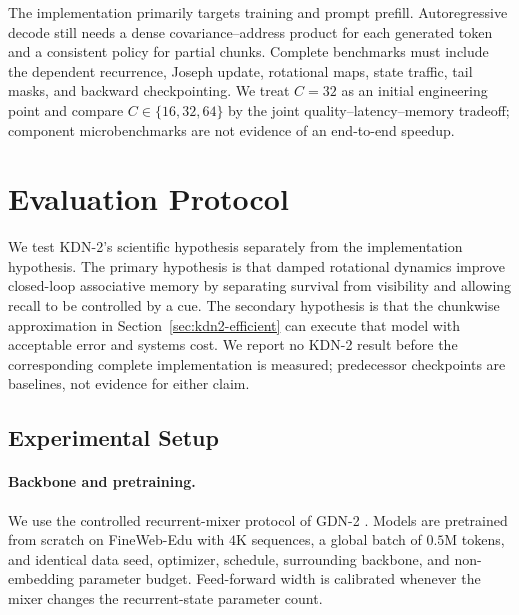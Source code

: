 \documentclass[11pt,letterpaper,logo]{yalearxiv}
\begin{document}
The implementation primarily targets training and prompt prefill. Autoregressive decode still
needs a dense covariance--address product for each generated token and a consistent policy for
partial chunks. Complete benchmarks must include the dependent recurrence, Joseph update,
rotational maps, state traffic, tail masks, and backward checkpointing. We treat $C=32$ as an
initial engineering point and compare $C\in\{16,32,64\}$ by the joint quality--latency--memory
tradeoff; component microbenchmarks are not evidence of an end-to-end speedup.

\section{Evaluation Protocol}
\label{sec:kdn2-experiments}

We test KDN-2's scientific hypothesis separately from the implementation hypothesis. The primary
hypothesis is that damped rotational dynamics improve closed-loop associative memory by separating
survival from visibility and allowing recall to be controlled by a cue. The secondary hypothesis
is that the chunkwise approximation in Section~\ref{sec:kdn2-efficient} can execute that model with
acceptable error and systems cost. We report no KDN-2 result before the corresponding complete
implementation is measured; predecessor checkpoints are baselines, not evidence for either claim.

\subsection{Experimental Setup}
\label{sec:kdn2-experimental-setup}

\paragraph{Backbone and pretraining.}
We use the controlled recurrent-mixer protocol of GDN-2
\citep{hatamizadeh2026gdn2}. Models are pretrained from scratch on FineWeb-Edu
\citep{penedo2024fineweb} with $4$K sequences, a global batch of $0.5$M tokens, and identical data
seed, optimizer, schedule, surrounding backbone, and non-embedding parameter budget. Feed-forward
width is calibrated whenever the mixer changes the recurrent-state parameter count.
\end{document}
